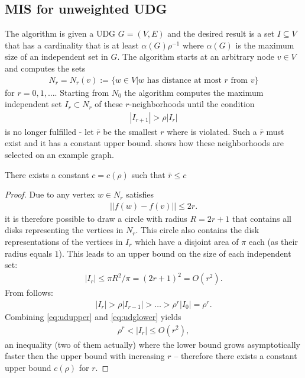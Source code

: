 \subsection{MIS for unweighted UDG}\label{sec:misudg}
The algorithm is given a UDG $G = (V,E)$ and the desired result is a set $I \subseteq V$ that has a cardinality that is at least $\alpha(G)\rho^{-1}$ where $\alpha(G)$ is the maximum size of an independent set in $G$.
The algorithm starts at an arbitrary node $v\in V$ and computes the sets
\begin{align*}
N_r = N_r(v) := \{w\in V|w \text{ has distance at most $r$ from $v$}\}
\end{align*} for $r = 0,1,\ldots$. Starting from $N_0$ the algorithm computes the maximum independent set $I_r \subset N_r$ of these $r$-neighborhoods until the condition
\begin{align}
|I_{r+1}| > \rho|I_r| \label{eq:udgcond}
\end{align}is no longer fulfilled - let $\bar r$ be the smallest $r$ where  is violated. Such a $\bar r$ must exist and it has a constant upper bound.
 shows how these neighborhoods are selected on an example graph.

\begin{theorem}
There exists a constant $c= c(\rho)$ such that $\bar r \leq c$
\end{theorem}
\begin{proof}
Due to  any vertex $w\in N_r$  satisfies
\begin{align*}
||f(w) - f(v)|| \leq 2r. 
\end{align*}
it is therefore possible to draw a circle with radius $R = 2r+1$ that contains all disks representing the vertices in $N_r$. This circle also contains the disk representations of the vertices in $I_r$ which have a disjoint area of $\pi$ each (as their radius equals $1$). This leads to an upper bound on the size of each independent set:
\begin{align}
|I_r| \leq \pi R^2 /\pi = (2r+1)^2 = O(r^2).\label{eq:udupper}
\end{align}
From follows:
\begin{align}
|I_r| > \rho|I_{r-1}| > \ldots  > \rho^r|I_0| = \rho^r.\label{eq:udglower}
\end{align}
Combining \eqref{eq:udupper} and \eqref{eq:udglower} yields
\begin{align}
\rho^r < |I_r| \leq O(r^2), \label{eq:upperboundlol}
\end{align}
an inequality (two of them actually) where the lower bound grows asymptotically faster then the upper bound with increasing $r$ -- therefore there exists a constant upper bound $c(\rho)$ for $r$.
\end{proof}
